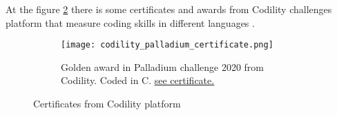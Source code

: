    At the figure \ref{fig:certificados_codility} there is some certificates and awards from Codility challenges platform that measure coding skills in different languages .
   \begin{figure}
      \begin{center}
         \begin{subfigure}[b]{0.45\textwidth}
            \texttt{[image: codility\_palladium\_certificate.png]}
            \caption{Golden award in Palladium challenge 2020 from Codility. Coded in C. \href {\linkcodilitycertone}{see certificate.}}
            \label{fig:latex}
         \end{subfigure}%
         \hfill
         \begin{subfigure}[b]{0.45\textwidth}
         \end{subfigure}%
      \end{center}

      \caption{Certificates from Codility platform}
      \label{fig:certificados_codility}
   \end{figure}
